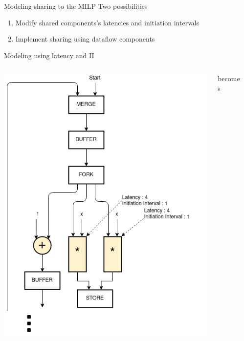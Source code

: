 \documentclass{beamer}
\begin{document}
\begin{frame}{Modeling sharing to the MILP}
Two possibilities
\begin{enumerate}
    \item Modify shared components's latencies and initiation intervals
    \item Implement sharing using dataflow components
\end{enumerate}
\end{frame}

\begin{frame}{Modeling using latency and II}
      \begin{columns}[T]
    \begin{column}{0.25\textwidth}
      \includegraphics[scale=0.25]{latency_unshared.png}
    \end{column}
    \begin{column}{0.1\textwidth}
    \begin{center}
        becomes
    \end{center}
    \end{column}
    \begin{column}{0.25\textwidth}

\end{column}
\end{columns}
\end{frame}
\end{document}
